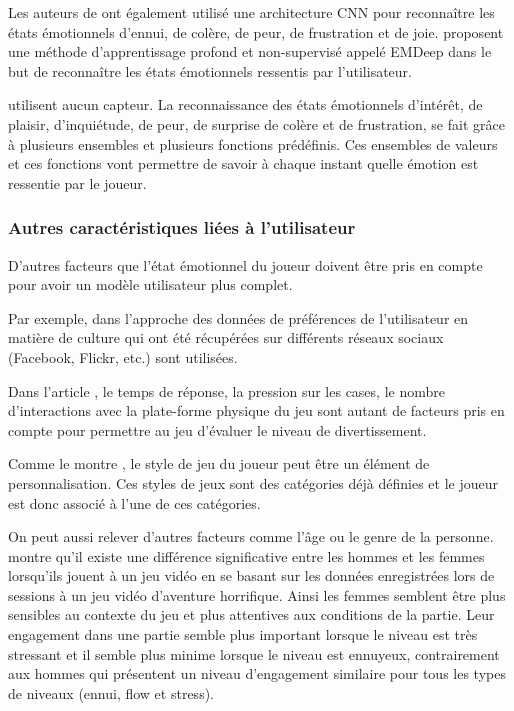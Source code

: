 \documentclass[11pt]{article}
\begin{document}
            Les auteurs de \cite{yang_et_al._2018} ont également utilisé une architecture CNN pour reconnaître les états émotionnels d'ennui, de colère, de peur, de frustration et de joie. 
            \cite{gal_2019,gal_et_al._2020} proposent une méthode d'apprentissage profond et non-supervisé appelé EMDeep dans le but de reconnaître les états émotionnels ressentis par l'utilisateur.\par
            \cite{Mostefai_et_al._2019} utilisent aucun capteur. La reconnaissance des états émotionnels d'intérêt, de plaisir, d'inquiétude, de peur, de surprise de colère et de frustration, se fait grâce à plusieurs ensembles et plusieurs fonctions prédéfinis. Ces ensembles de valeurs et ces fonctions vont permettre de savoir à chaque instant quelle émotion est ressentie par le joueur.
	    \subsubsection{Autres caractéristiques liées à l'utilisateur} \label{sec:caractéristiques}
	        D’autres facteurs que l’état émotionnel du joueur doivent être pris en compte pour avoir un modèle utilisateur plus complet.\par
	        Par exemple, dans l'approche \cite{noor_et_al._2009} des données de préférences de l’utilisateur en matière de culture qui ont été récupérées sur différents réseaux sociaux (Facebook, Flickr, etc.) sont utilisées.\par
	        Dans l’article \cite{yannakakis_et_al._2009}, le temps de réponse, la pression sur les cases, le nombre d’interactions avec la plate-forme physique du jeu sont autant de facteurs pris en compte pour permettre au jeu d'évaluer le niveau de divertissement.\par
	        Comme le montre \cite{Mostefai_et_al._2019}, le style de jeu du joueur peut être un élément de personnalisation. 
	        Ces styles de jeux sont des catégories déjà définies et le joueur est donc associé à l'une de ces catégories.\par
	        On peut aussi relever d’autres facteurs comme l’âge ou le genre de la personne. \cite{carofiglio_et_al._2019} montre qu'il existe une différence significative entre les hommes et les femmes lorsqu’ils jouent à un jeu vidéo en se basant sur les données enregistrées lors de sessions à un jeu vidéo d’aventure horrifique. 
	        Ainsi les femmes semblent être plus sensibles au contexte du jeu et plus attentives aux conditions de la partie. 
	        Leur engagement dans une partie semble plus important lorsque le niveau est très stressant et il semble plus minime lorsque le niveau est ennuyeux, contrairement aux hommes qui présentent un niveau d’engagement similaire  pour tous les types de niveaux (ennui, flow et stress).
\end{document}
